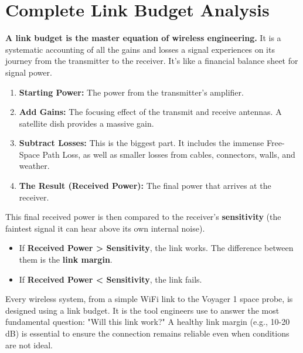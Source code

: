 
\chapter{Complete Link Budget Analysis}
\label{ch:linkbudget}

\begin{nontechnical}
    \textbf{A link budget is the master equation of wireless engineering.} It is a systematic accounting of all the gains and losses a signal experiences on its journey from the transmitter to the receiver. It's like a financial balance sheet for signal power.

    \begin{enumerate}
        \item \textbf{Starting Power:} The power from the transmitter's amplifier.
        \item \textbf{Add Gains:} The focusing effect of the transmit and receive antennas. A satellite dish provides a massive gain.
        \item \textbf{Subtract Losses:} This is the biggest part. It includes the immense Free-Space Path Loss, as well as smaller losses from cables, connectors, walls, and weather.
        \item \textbf{The Result (Received Power):} The final power that arrives at the receiver.
    \end{enumerate}

    This final received power is then compared to the receiver's \textbf{sensitivity} (the faintest signal it can hear above its own internal noise).
    \begin{itemize}
        \item If \textbf{Received Power > Sensitivity}, the link works. The difference between them is the \textbf{link margin}.
        \item If \textbf{Received Power < Sensitivity}, the link fails.
    \end{itemize}

     Every wireless system, from a simple WiFi link to the Voyager 1 space probe, is designed using a link budget. It is the tool engineers use to answer the most fundamental question: "Will this link work?" A healthy link margin (e.g., 10-20 dB) is essential to ensure the connection remains reliable even when conditions are not ideal.
\end{nontechnical}


